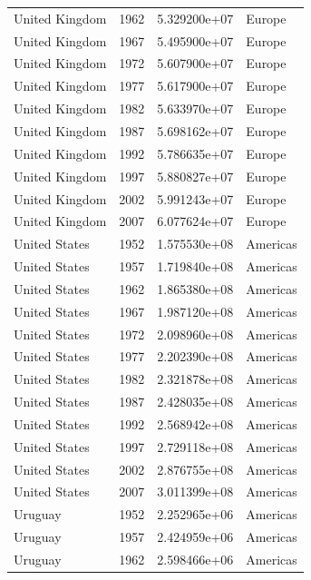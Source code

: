 \documentclass[
  letterpaper,
  DIV=11,
  numbers=noendperiod]{scrreprt}
\begin{document}
\begin{tcolorbox}
\begin{tabular}{lrrl}
United Kingdom           &  1962 &  5.329200e+07 &    Europe \\
United Kingdom           &  1967 &  5.495900e+07 &    Europe \\
United Kingdom           &  1972 &  5.607900e+07 &    Europe \\
United Kingdom           &  1977 &  5.617900e+07 &    Europe \\
United Kingdom           &  1982 &  5.633970e+07 &    Europe \\
United Kingdom           &  1987 &  5.698162e+07 &    Europe \\
United Kingdom           &  1992 &  5.786635e+07 &    Europe \\
United Kingdom           &  1997 &  5.880827e+07 &    Europe \\
United Kingdom           &  2002 &  5.991243e+07 &    Europe \\
United Kingdom           &  2007 &  6.077624e+07 &    Europe \\
United States            &  1952 &  1.575530e+08 &  Americas \\
United States            &  1957 &  1.719840e+08 &  Americas \\
United States            &  1962 &  1.865380e+08 &  Americas \\
United States            &  1967 &  1.987120e+08 &  Americas \\
United States            &  1972 &  2.098960e+08 &  Americas \\
United States            &  1977 &  2.202390e+08 &  Americas \\
United States            &  1982 &  2.321878e+08 &  Americas \\
United States            &  1987 &  2.428035e+08 &  Americas \\
United States            &  1992 &  2.568942e+08 &  Americas \\
United States            &  1997 &  2.729118e+08 &  Americas \\
United States            &  2002 &  2.876755e+08 &  Americas \\
United States            &  2007 &  3.011399e+08 &  Americas \\
Uruguay                  &  1952 &  2.252965e+06 &  Americas \\
Uruguay                  &  1957 &  2.424959e+06 &  Americas \\
Uruguay                  &  1962 &  2.598466e+06 &  Americas \\

\end{tabular}
\end{tcolorbox}
\end{document}
